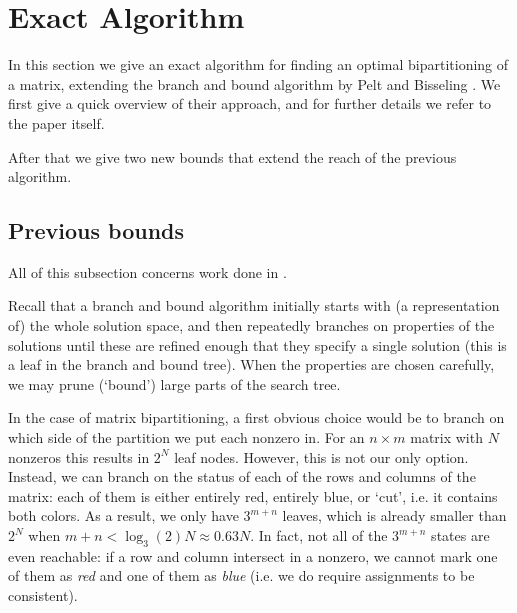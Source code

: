 	\section{Exact Algorithm}
	\label{sec:opt}

	In this section we give an exact algorithm for finding an optimal
	bipartitioning of a matrix, extending the branch and bound
	algorithm by Pelt and
	Bisseling \cite{pelt15}. We first give a quick overview
	of their approach, and for further details we refer to the paper
	itself.

	After that we give two new bounds that extend the reach of the previous
	algorithm.

	\subsection{Previous bounds}

	All of this subsection concerns work done in \cite{pelt15}.

	Recall that a branch and bound algorithm initially starts with
	(a representation of) the whole solution space, and then repeatedly
	branches on properties of the solutions until these are refined
	enough that they specify a single solution (this is a leaf in the branch
	and bound tree). When the properties are
	chosen carefully, we may prune (`bound') large parts of the search
	tree.

	In the case of matrix bipartitioning, a first obvious choice would 
	be to branch on
	which side of the partition we put each nonzero in. For an $n \times m$
	matrix with $N$ nonzeros this results in $2^N$ leaf nodes. However,
	this is not our only option.
	Instead, we can branch on the status of each of the
	rows and columns of the matrix: each of them is either entirely red,
	entirely blue, or `cut', i.e. it contains both colors. As a result, we
	only have $3^{m+n}$ leaves, which is already smaller than $2^N$ when
	$m + n < \log_3(2) N \approx 0.63N$. In fact, not all of the $3^{m+n}$
	states are even reachable: if a row and column intersect in a nonzero,
	we cannot mark one of them as \textit{red} and one of them as \textit{blue}
	(i.e. we do require assignments to be consistent).

